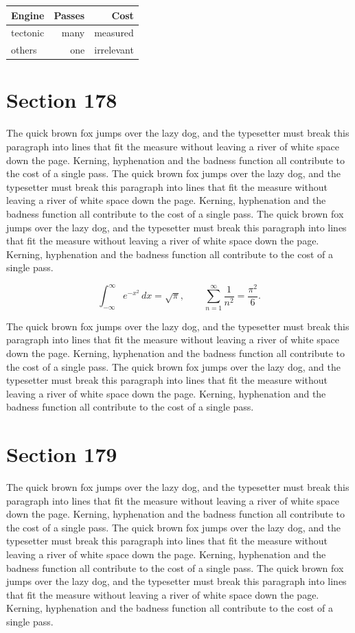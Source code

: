 \documentclass{article}
\begin{document}
\begin{center}
\begin{tabular}{lrr}
\toprule
Engine & Passes & Cost \\
\midrule
tectonic & many & measured \\
others & one & irrelevant \\
\bottomrule
\end{tabular}
\end{center}

\section{Section 178}
The quick brown fox jumps over the lazy dog, and the typesetter must break this paragraph into lines that fit the measure without leaving a river of white space down the page. Kerning, hyphenation and the badness function all contribute to the cost of a single pass. The quick brown fox jumps over the lazy dog, and the typesetter must break this paragraph into lines that fit the measure without leaving a river of white space down the page. Kerning, hyphenation and the badness function all contribute to the cost of a single pass. The quick brown fox jumps over the lazy dog, and the typesetter must break this paragraph into lines that fit the measure without leaving a river of white space down the page. Kerning, hyphenation and the badness function all contribute to the cost of a single pass. 

\begin{equation}
\int_{-\infty}^{\infty} e^{-x^{2}}\,dx = \sqrt{\pi}, \qquad
\sum_{n=1}^{\infty} \frac{1}{n^{2}} = \frac{\pi^{2}}{6}.
\end{equation}

The quick brown fox jumps over the lazy dog, and the typesetter must break this paragraph into lines that fit the measure without leaving a river of white space down the page. Kerning, hyphenation and the badness function all contribute to the cost of a single pass. The quick brown fox jumps over the lazy dog, and the typesetter must break this paragraph into lines that fit the measure without leaving a river of white space down the page. Kerning, hyphenation and the badness function all contribute to the cost of a single pass. 
\section{Section 179}
The quick brown fox jumps over the lazy dog, and the typesetter must break this paragraph into lines that fit the measure without leaving a river of white space down the page. Kerning, hyphenation and the badness function all contribute to the cost of a single pass. The quick brown fox jumps over the lazy dog, and the typesetter must break this paragraph into lines that fit the measure without leaving a river of white space down the page. Kerning, hyphenation and the badness function all contribute to the cost of a single pass. The quick brown fox jumps over the lazy dog, and the typesetter must break this paragraph into lines that fit the measure without leaving a river of white space down the page. Kerning, hyphenation and the badness function all contribute to the cost of a single pass. 
\end{document}
